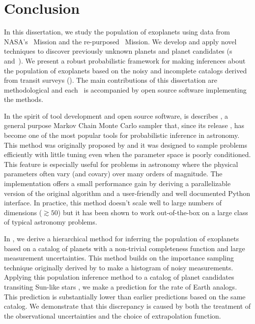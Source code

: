 \chapter*{Conclusion}

In this dissertation, we study the population of exoplanets using data from
NASA's \kepler\ Mission and the re-purposed \KT\ Mission.
We develop and apply novel techniques to discover previously unknown planets
and planet candidates (\chapname s~ and~).
We present a robust probabilistic framework for making inferences about the
population of exoplanets based on the noisy and incomplete catalogs derived
from transit surveys ().
The main contributions of this dissertation are methodological and each
\chapname\ is accompanied by open source software implementing the methods.

In the spirit of tool development and open source software,  is
describes , a general purpose Markov Chain Monte Carlo sampler
that, since its release \citep{Foreman-Mackey:2013}, has become one of the
most popular tools for probabilistic inference in astronomy.
This method was originally proposed by \citet{Goodman:2010} and it was
designed to sample problems efficiently with little tuning even when the
parameter space is poorly conditioned.
This feature is especially useful for problems in astronomy where the physical
parameters often vary (and covary) over many orders of magnitude.
The  implementation offers a small performance gain by deriving
a parallelizable version of the original algorithm and a user-friendly and
well documented Python interface.
In practice, this method doesn't scale well to large numbers of dimensions
($\gtrsim 50$) but it has been shown to work out-of-the-box on a large class
of typical astronomy problems.

In , we derive a hierarchical method for inferring the population
of exoplanets based on a catalog of planets with a non-trivial completeness
function and large measurement uncertainties.
This method builds on the importance sampling technique originally derived by
\citet{Hogg:2010a} to make a histogram of noisy measurements.
Applying this population inference method to a catalog of planet candidates
transiting Sun-like stars \citep{Petigura:2013}, we make a prediction for the
rate of Earth analogs.
This prediction is substantially lower than earlier predictions based on the
same catalog.
We demonstrate that this discrepancy is caused by both the treatment of the
observational uncertainties and the choice of extrapolation function.


